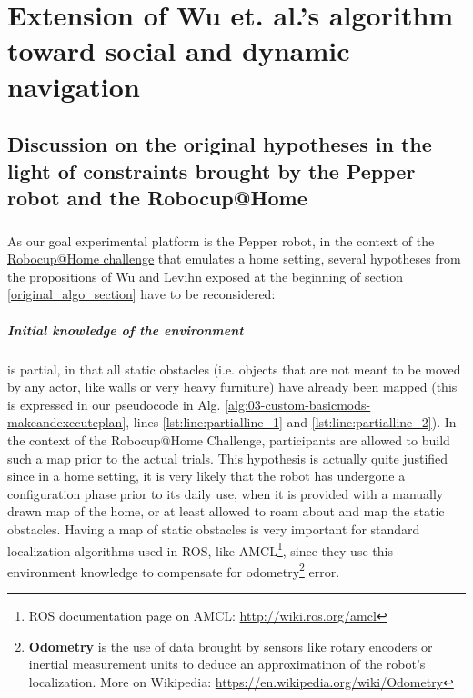 
\chapter{Extension of Wu et. al.'s algorithm toward social and dynamic navigation} %

\label{Chapter4} %

\section{Discussion on the original hypotheses in the light of constraints brought by the Pepper robot and the Robocup@Home}\label{discussion_hypotheses_section}

\paragraph{} As our goal experimental platform is the Pepper robot, in the context of the \href{http://www.robocupathome.org/}{Robocup@Home challenge} that emulates a home setting, several hypotheses from the propositions of Wu and Levihn \parencite{wu_navigation_2010, levihn_locally_2014} exposed at the beginning of section \ref{original_algo_section} have to be reconsidered:

\paragraph{Initial knowledge of the environment} is partial, in that all static obstacles (i.e. objects that are not meant to be moved by any actor, like walls or very heavy furniture) have already been mapped (this is expressed in our pseudocode in Alg. \ref{alg:03-custom-basicmods-makeandexecuteplan}, lines \ref{lst:line:partialline_1} and \ref{lst:line:partialline_2}). In the context of the Robocup@Home Challenge, participants are allowed to build such a map prior to the actual trials. This hypothesis is actually quite justified since in a home setting, it is very likely that the robot has undergone a configuration phase prior to its daily use, when it is provided with a manually drawn map of the home, or at least allowed to roam about and map the static obstacles. Having a map of static obstacles is very important for standard localization algorithms used in ROS, like AMCL\footnote{ROS documentation page on AMCL: \url{http://wiki.ros.org/amcl}}, since they use this environment knowledge to compensate for odometry\footnote{\textbf{Odometry} is the use of data brought by sensors like rotary encoders or inertial measurement units to deduce an approximatinon of the robot's localization. More on Wikipedia: \url{https://en.wikipedia.org/wiki/Odometry}} error.


